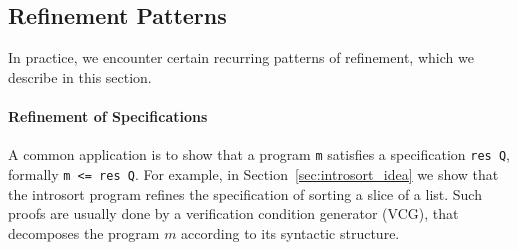 \documentclass[acmsmall]{acmart}
\newcommand{\is}{\lstinline[language=isabelle]}
\newcommand{\wrt}{w.\,r.\,t.\xspace}
\begin{document}

\begin{comment}
Refinements in parametric form can be composed as follows:
\begin{lstlisting}
    [| (m$_3$, m$_2$) \<in> R$_2$ -> S$_2$; (m$_2$, m_1) \<in> R_1 -> S_1 |] ==> (m$_3$, m_1) \<in> (R$_2$ $O$ R_1) -> (S$_2$ $O$ S_1)
\end{lstlisting} 
Here, \is{R$_2$ $O$ R_1} is the composition of relations. 
The identity relation is the neutral element for that operation: \is{Id $O$ $R$ = R $O$ $Id$ = R}.
\end{comment}



\subsection{Refinement Patterns} \label{sec:refinement_patterns}
In practice, we encounter certain recurring patterns of refinement, which we describe in this section.

\paragraph{Refinement of Specifications}
A common application is to show that a program \is$m$ satisfies a specification \is$res Q$, formally \is{m <= res Q}. For example, in Section~\ref{sec:introsort_idea} we show that the introsort program refines the specification of sorting a slice of a list.
Such proofs are usually done by a verification condition generator (VCG), that decomposes the program $m$ according to its syntactic structure.
\end{document}
